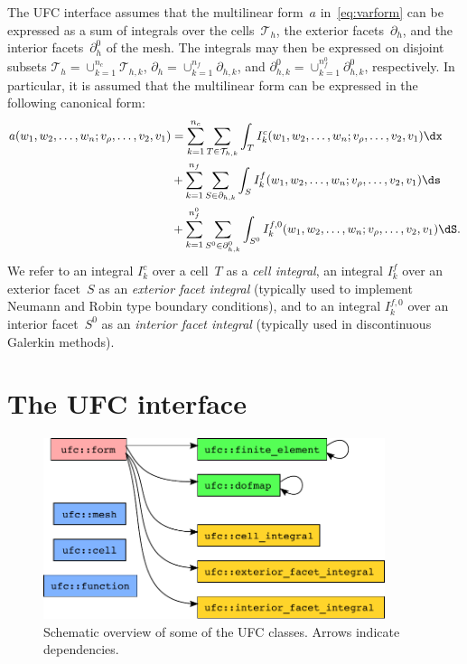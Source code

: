 The UFC interface assumes that the multilinear form~$a$
in~\eqref{eq:varform} can be expressed as a sum of integrals over the
cells~$\mathcal{T}_h$, the exterior facets~$\partial_h$, and the
interior facets~$\partial_h^0$ of the mesh. The integrals may then be
expressed on disjoint subsets $\mathcal{T}_h = \cup_{k=1}^{n_c}
\mathcal{T}_{h,k}$, $\partial_h = \cup_{k=1}^{n_f} \partial_{h,k}$,
and $\partial_{h,k}^0 = \cup_{k=1}^{n_f^0} \partial_{h,k}^0$,
respectively. In particular, it is assumed that the multilinear form
can be expressed in the following canonical form:
\begin{equation} \label{eq:form_integrals}
  \begin{split}
    a(w_1, w_2, \ldots, w_n; v_{\rho}, \ldots, v_2, v_1)
    &=
    \sum_{k=1}^{n_c} \sum_{T\in\mathcal{T}_{h,k}} \int_{T}
    I^c_k(w_1, w_2, \ldots, w_n; v_{\rho}, \ldots, v_2, v_1) \dx \\
    &+
    \sum_{k=1}^{n_f} \sum_{S\in\partial_{h,k}} \int_{S}
    I^f_k(w_1, w_2, \ldots, w_n; v_{\rho}, \ldots, v_2, v_1) \ds \\
    &+
    \sum_{k=1}^{n_f^0} \sum_{S^0\in\partial_{h,k}^0} \int_{S^0}
    I^{f,0}_k(w_1, w_2, \ldots, w_n; v_{\rho}, \ldots, v_2, v_1) \dS.
  \end{split}
\end{equation}
We refer to an integral $I^c_k$ over a cell~$T$ as a \emph{cell
  integral}, an integral $I^f_k$ over an exterior facet~$S$ as an
\emph{exterior facet integral} (typically used to implement Neumann
and Robin type boundary conditions), and to an integral $I^{f,0}_k$
over an interior facet~$S^0$ as an \emph{interior facet integral}
(typically used in discontinuous Galerkin methods).

\section{The UFC interface}
\label{sec:alnes-2:ufc:syntax}

\begin{figure}
  \begin{center}
    \includegraphics[width=10cm]{chapters/alnes-2/pdf/ufc_classes.pdf}
    \caption{Schematic overview of some of the UFC classes. Arrows indicate dependencies.}
    \label{fig:uml}
  \end{center}
\end{figure}

